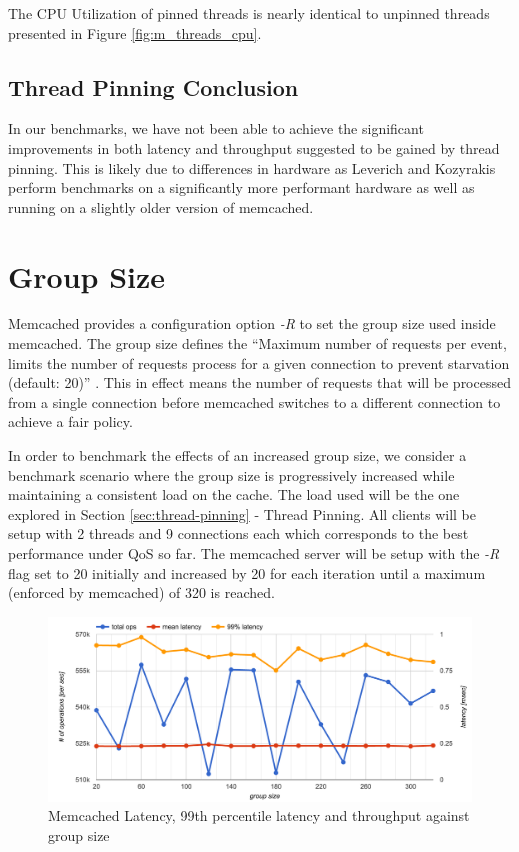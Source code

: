 The CPU Utilization of pinned threads is nearly identical to unpinned threads presented in Figure \ref{fig:m_threads_cpu}.

\subsection{Thread Pinning Conclusion}

In our benchmarks, we have not been able to achieve the significant improvements in both latency and throughput suggested to be gained by thread pinning. This is likely due to differences in hardware as Leverich and Kozyrakis \cite{leverich2014reconciling} perform benchmarks on a significantly more performant hardware as well as running on a slightly older version of memcached.


\section{Group Size}
Memcached provides a configuration option \textit{-R} to set the group size used inside memcached. The group size defines the ``Maximum number of requests per event, limits the number of requests process for a given connection to prevent starvation (default: 20)'' \cite{interactive2006memcached}. This in effect means the number of requests that will be processed from a single connection before memcached switches to a different connection to achieve a fair policy.

In order to benchmark the effects of an increased group size, we consider a benchmark scenario where the group size is progressively increased while maintaining a consistent load on the cache. The load used will be the one explored in Section \ref{sec:thread-pinning} - Thread Pinning. All clients will be setup with 2 threads and 9 connections each which corresponds to the best performance under QoS so far. The memcached server will be setup with the \textit{-R} flag set to 20 initially and increased by 20 for each iteration until a maximum (enforced by memcached) of 320 is reached.

\begin{figure}[h]
    \includegraphics[width=\textwidth]{./res/5_memcached_group_size.png}
    \caption{Memcached Latency, 99th percentile latency and throughput against group size}
    \label{fig:memcached_group_size}
\end{figure}


